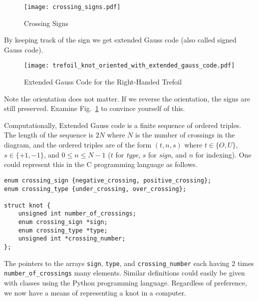 \documentclass{article}
\theoremstyle{plain}
\begin{document}
        \begin{figure}
            \centering
            \texttt{[image: crossing\_signs.pdf]}
            \caption{Crossing Signs}
            \label{fig:crossing_signs}
        \end{figure}
        By keeping track of the sign we get extended Gauss code
        (also called signed Gauss code).
        \begin{figure}
            \centering
            \texttt{[image: trefoil\_knot\_oriented\_with\_extended\_gauss\_code.pdf]}
            \caption{Extended Gauss Code for the Right-Handed Trefoil}
            \label{fig:right_hand_trefoil_extended_gauss}
        \end{figure}
        Note the orientation does not matter. If we reverse the orientation,
        the signs are still preserved. Examine Fig.~\ref{fig:crossing_signs} to
        convince yourself of this.
        \par\hfill\par
        Computationally, Extended Gauss code is a finite sequence of ordered
        triples. The length of the sequence is $2N$ where $N$ is the number of
        crossings in the diagram, and the ordered triples are of the form
        $(t,n,s)$ where $t\in\{O,U\}$, $s\in\{+1,-1\}$, and
        $0\leq{n}\leq{N-1}$ ($t$ for \textit{type}, $s$ for \textit{sign}, and
        $n$ for indexing). One could represent this in the C programming
        language as follows.
\begin{lstlisting}[style=CStyle]
enum crossing_sign {negative_crossing, positive_crossing};
enum crossing_type {under_crossing, over_crossing};

struct knot {
    unsigned int number_of_crossings;
    enum crossing_sign *sign;
    enum crossing_type *type;
    unsigned int *crossing_number;
};
\end{lstlisting}
        The pointers to the arrays \texttt{sign}, \texttt{type}, and
        \texttt{crossing\_number} each having 2 times
        \texttt{number\_of\_crossings} many elements.
        Similar definitions could easily be given with classes using the
        Python programming language. Regardless of preference, we now have a
        means of representing a knot in a computer.
\end{document}
